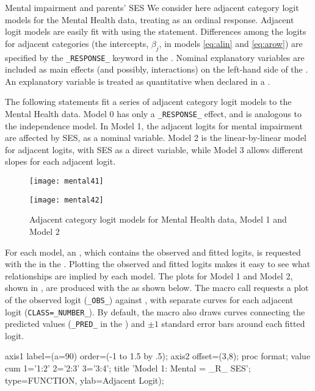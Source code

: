 \begin{Example}[mental4]{Mental impairment and parents' SES}
We consider here adjacent category logit models for the Mental Health
data, treating  as an ordinal response.
Adjacent logit models are easily fit with 
using the  statement.
Differences among the logits for adjacent categories (the intercepts, $\beta_j$, in models \eqref{eq:alin} and \eqref{eq:arow}) are
specified by the \verb|_RESPONSE_| keyword in the
.  Nominal explanatory variables are included
as main effects (and possibly, interactions) on the left-hand side
of the .  An explanatory variable is treated
as quantitative when declared in a .

The following statements fit a series of adjacent category logit models
to the Mental Health data.  Model 0 has only a \verb|_RESPONSE_|
effect, and is analogous to the independence model.
In Model 1, the adjacent logits for mental impairment are affected
by SES, as a nominal variable.
Model 2 is the linear-by-linear model for adjacent logits, with
SES as a direct variable,
while Model 3 allows different slopes for each adjacent logit.

\begin{figure}[htb]
 \begin{minipage}[t]{.49\linewidth}
  \texttt{[image: mental41]}
 \end{minipage}%
 \hfill
 \begin{minipage}[t]{.49\linewidth}
  \texttt{[image: mental42]}
 \end{minipage}
 \caption{Adjacent category logit models for Mental Health data, Model 1 and Model 2}\label{fig:mental4a}
\end{figure}

For each model, an \ODS, which contains the observed and fitted logits,
is requested with the  in the .
Plotting the observed and fitted logits
makes it easy to see what relationships are implied by each model.
The plots for Model 1 and Model 2, shown in ,
are produced with the 
as shown below.
The macro call requests a plot of the observed logit
(\verb|_OBS_|) against , with separate curves for each
adjacent logit (\verb|CLASS=_NUMBER_|).
By default, the macro also draws curves connecting the predicted
values (\verb|_PRED_| in the \ODS) and $\pm 1$ standard error bars
around each fitted logit.
\begin{listing}
axis1 label=(a=90) order=(-1 to 1.5 by .5);
axis2 offset=(3,8);
proc format;
   value cum 1='1:2'  2='2:3'  3='3:4';
title 'Model 1: Mental = _R_ SES';
   type=FUNCTION, ylab=Adjacent Logit);


\end{listing}
\end{Example}
